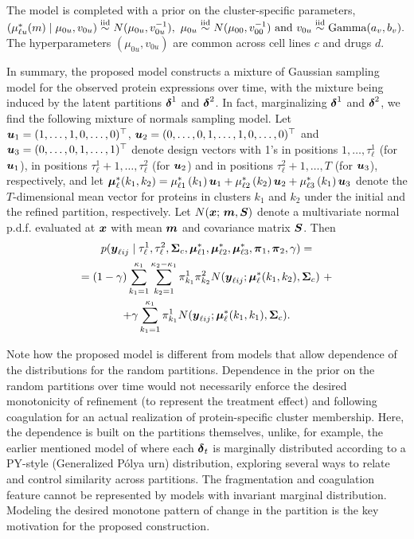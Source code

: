 The model is completed with a prior on the cluster-specific parameters, $  (\mu^*_{\ell u}(m)\mid \mu_{0u}, v_{0u}) \stackrel{\mbox{\scriptsize iid}}{\sim} N(\mu_{0u}, v^{-1}_{0u}), \
  \mu_{0u} \stackrel{\mbox{\scriptsize iid}}{\sim}  N(\mu_{00}, v^{-1}_{00}) \ \mbox{and} \
  v_{0u}   \stackrel{\mbox{\scriptsize iid}}{\sim}  \mbox{Gamma}(a_v, b_v).$
The hyperparameters $(\mu_{0u},v_{0u})$ are common across cell lines $c$
and drugs $d$. 

In summary, the proposed model constructs a mixture of Gaussian sampling model
for the observed protein expressions over time, with the mixture being
induced by the latent partitions $\mbox{\boldmath $\delta$}^1$ and $\mbox{\boldmath $\delta$}^2$.
In fact,  marginalizing $\mbox{\boldmath $\delta$}^1$ and $\mbox{\boldmath $\delta$}^2$, we find the
following mixture of normals sampling model.
Let
$\mbox{\boldmath $u$}_1 = (1, \ldots, 1, 0, \ldots, 0)^{\top}$,
$\mbox{\boldmath $u$}_2 = (0, \ldots, 0, 1, \ldots, 1, 0, \ldots, 0)^{\top}$ and
$\mbox{\boldmath $u$}_3 = (0, \ldots, 0, 1, \ldots, 1)^{\top}$
denote design vectors with 1's in positions $1,\ldots,\tau^1_{\ell}$
(for $\mbox{\boldmath $u$}_1$), 
in positions $\tau^1_{\ell}+1, \ldots, \tau^2_{\ell}$ (for $\mbox{\boldmath $u$}_2$) and
in positions $\tau^2_{\ell} + 1, \ldots, T$ (for $\mbox{\boldmath $u$}_3$), respectively, and
let
$
\mbox{\boldmath $\mu$}^*_{\ell}(k_1, k_2) = \mu^*_{\ell 1}\left(k_1\right)\mbox{\boldmath $u$}_1 +
\mu^*_{\ell 2}\left(k_2\right)\mbox{\boldmath $u$}_2 + \mu^*_{\ell
  3}\left(k_1\right)\mbox{\boldmath $u$}_3
$
denote the $T$-dimensional mean vector for proteins in clusters $k_1$
and $k_2$ under the initial and the refined partition, respectively. Let $N(\mbox{\boldmath $x$};\, \mbox{\boldmath $m$}, \mbox{\boldmath $S$})$ denote a multivariate normal p.d.f. evaluated at $\mbox{\boldmath $x$}$ with mean $\mbox{\boldmath $m$}$ and covariance matrix $\mbox{\boldmath $S$}$. Then
\begin{multline*}
p(\mbox{\boldmath $y$}_{\ell ij} \mid \tau^1_{\ell}, \tau^2_{\ell}, \mbox{\boldmath $\Sigma$}_c, 
 \mbox{\boldmath $\mu$}^*_{\ell 1}, \mbox{\boldmath $\mu$}^*_{\ell 2}, \mbox{\boldmath $\mu$}^*_{\ell 3}, \mbox{\boldmath $\pi$}_1,
 \mbox{\boldmath $\pi$}_2, \gamma)=\\
= (1-\gamma) \sum^{\kappa_1}_{k_1=1}\sum^{\kappa_2-\kappa_1}_{k_2=1} 
   \pi^1_{k_1}\pi^2_{k_2}N(\mbox{\boldmath $y$}_{\ell ij} ; \mbox{\boldmath $\mu$}^*_{\ell}(k_1, k_2), \mbox{\boldmath $\Sigma$}_c) \
+ \\ 
+\gamma \sum^{\kappa_1}_{k_1 = 1} 
   \pi^1_{k_1}N(\mbox{\boldmath $y$}_{\ell ij} ; \mbox{\boldmath $\mu$}^*_{\ell}(k_1, k_1),
   \mbox{\boldmath $\Sigma$}_c). 
 \label{eq:marginal_likelihood} 
\end{multline*}

Note how the proposed model is different from models that allow dependence
of the distributions for the random partitions. 
Dependence in the prior on the random partitions over time would not necessarily
enforce the desired monotonicity of refinement (to represent the
treatment effect) and following coagulation for an actual realization
of protein-specific cluster membership.
Here, the dependence is built on the partitions themselves, unlike,
for example, the earlier 
mentioned model of \cite{caronetal:07} where each $\mbox{\boldmath $\delta$}_t$ is marginally
distributed according to a PY-style (Generalized P\'olya urn) distribution, 
exploring several ways to relate and control similarity across partitions.
The fragmentation
and coagulation feature cannot be represented by models with invariant
marginal distribution. Modeling the desired monotone pattern of change in
the partition is the key motivation for the proposed construction.

